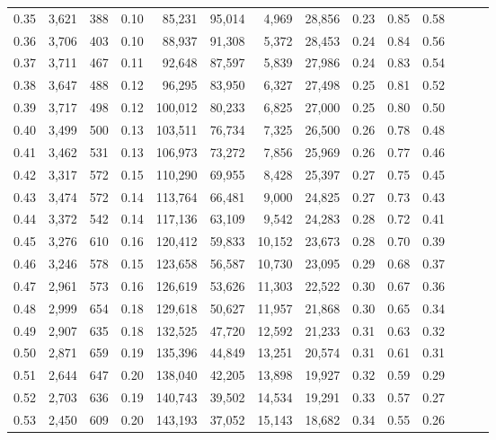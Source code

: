 \begin{tabular}{rrrrrrrrrrrrrr}
0.35 &  3,621 &  388 &  0.10 &   85,231 &   95,014 &   4,969 &  28,856 &  0.23 &  0.85 &      0.58 \\
0.36 &  3,706 &  403 &  0.10 &   88,937 &   91,308 &   5,372 &  28,453 &  0.24 &  0.84 &      0.56 \\
0.37 &  3,711 &  467 &  0.11 &   92,648 &   87,597 &   5,839 &  27,986 &  0.24 &  0.83 &      0.54 \\
0.38 &  3,647 &  488 &  0.12 &   96,295 &   83,950 &   6,327 &  27,498 &  0.25 &  0.81 &      0.52 \\
0.39 &  3,717 &  498 &  0.12 &  100,012 &   80,233 &   6,825 &  27,000 &  0.25 &  0.80 &      0.50 \\
0.40 &  3,499 &  500 &  0.13 &  103,511 &   76,734 &   7,325 &  26,500 &  0.26 &  0.78 &      0.48 \\
0.41 &  3,462 &  531 &  0.13 &  106,973 &   73,272 &   7,856 &  25,969 &  0.26 &  0.77 &      0.46 \\
0.42 &  3,317 &  572 &  0.15 &  110,290 &   69,955 &   8,428 &  25,397 &  0.27 &  0.75 &      0.45 \\
0.43 &  3,474 &  572 &  0.14 &  113,764 &   66,481 &   9,000 &  24,825 &  0.27 &  0.73 &      0.43 \\
0.44 &  3,372 &  542 &  0.14 &  117,136 &   63,109 &   9,542 &  24,283 &  0.28 &  0.72 &      0.41 \\
0.45 &  3,276 &  610 &  0.16 &  120,412 &   59,833 &  10,152 &  23,673 &  0.28 &  0.70 &      0.39 \\
0.46 &  3,246 &  578 &  0.15 &  123,658 &   56,587 &  10,730 &  23,095 &  0.29 &  0.68 &      0.37 \\
0.47 &  2,961 &  573 &  0.16 &  126,619 &   53,626 &  11,303 &  22,522 &  0.30 &  0.67 &      0.36 \\
0.48 &  2,999 &  654 &  0.18 &  129,618 &   50,627 &  11,957 &  21,868 &  0.30 &  0.65 &      0.34 \\
0.49 &  2,907 &  635 &  0.18 &  132,525 &   47,720 &  12,592 &  21,233 &  0.31 &  0.63 &      0.32 \\
0.50 &  2,871 &  659 &  0.19 &  135,396 &   44,849 &  13,251 &  20,574 &  0.31 &  0.61 &      0.31 \\
0.51 &  2,644 &  647 &  0.20 &  138,040 &   42,205 &  13,898 &  19,927 &  0.32 &  0.59 &      0.29 \\
0.52 &  2,703 &  636 &  0.19 &  140,743 &   39,502 &  14,534 &  19,291 &  0.33 &  0.57 &      0.27 \\
0.53 &  2,450 &  609 &  0.20 &  143,193 &   37,052 &  15,143 &  18,682 &  0.34 &  0.55 &      0.26 \\

\end{tabular}
